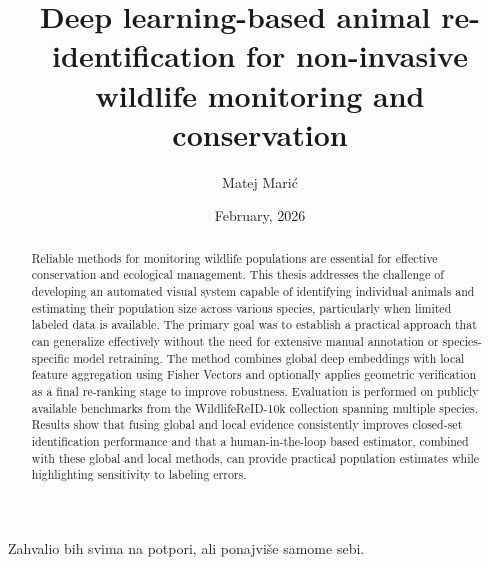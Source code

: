 \documentclass[masterthesis]{fer}
\title{Deep learning-based animal re-identification for non-invasive wildlife monitoring and conservation}
\author{Matej Marić}
\date{February, 2026}
\begin{document}
\maketitle


\begin{zahvale}
Zahvalio bih svima na potpori, ali ponajviše samome sebi.
\end{zahvale}

\mainmatter


\tableofcontents












\begin{abstract}
Reliable methods for monitoring wildlife populations are essential for effective conservation and ecological management. This thesis addresses the challenge of developing an automated visual system capable of identifying individual animals and estimating their population size across various species, particularly when limited labeled data is available. The primary goal was to establish a practical approach that can generalize effectively without the need for extensive manual annotation or species-specific model retraining. The method combines global deep embeddings with local feature aggregation using Fisher Vectors and optionally applies geometric verification as a final re-ranking stage to improve robustness. Evaluation is performed on publicly available benchmarks from the WildlifeReID-10k collection spanning multiple species. Results show that fusing global and local evidence consistently improves closed-set identification performance and that a human-in-the-loop based estimator, combined with these global and local methods, can provide practical population estimates while highlighting sensitivity to labeling errors.
\end{abstract}
\end{document}
